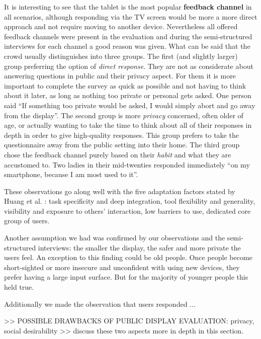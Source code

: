 	
	It is interesting to see that the tablet is the most popular \textbf{feedback channel} in all scenarios, although responding via the TV screen would be more a more direct approach and not require moving to another device. 
	Nevertheless all offered feedback channels were present in the evaluation and during the semi-structured interviews for each channel a good reason was given. What can be said that the crowd usually distinguishes into three groups. The first (and slightly larger) group preferring the option of \textit{direct response}. They are not as considerate about answering questions in public and their privacy aspect. For them it is more important to complete the survey as quick as possible and not having to think about it later, as long as nothing too private or personal gets asked. One person said ``If something too private would be asked, I would simply abort and go away from the display''. The second group is more \textit{privacy} concerned, often older of age, or actually wanting to take the time to think about all of their responses in depth in order to give high-quality responses. This group prefers to take the questionnaire away from the public setting into their home. The third group chose the feedback channel purely based on their \textit{habit} and what they are accustomed to. Two ladies in their mid-twenties responded immediately ``on my smartphone, because I am most used to it''.

	These observations go along well with the five adaptation factors stated by Huang et al. \cite{Huang2004}: task specificity and deep integration, tool flexibility and generality, visibility and exposure to others' interaction, low barriers to use, dedicated core group of users.

	Another assumption we had was confirmed by our observations and the semi-structured interviews: the smaller the display, the safer and more private the users feel. An exception to this finding could be old people. Once people become short-sighted or more insecure and unconfident with using new devices, they prefer having a large input surface. But for the majority of younger people this held true.

	Additionally we made the observation that users responded ...



	>> POSSIBLE DRAWBACKS OF PUBLIC DISPLAY EVALUATION: privacy, social desirability >> discuss these two aspects more in depth in this section.



